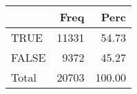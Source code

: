 
\begin{tabular}[t]{lrr}
\toprule
  & Freq & Perc\\
\midrule
TRUE & 11331 & 54.73\\
FALSE & 9372 & 45.27\\
Total & 20703 & 100.00\\
\bottomrule
\end{tabular}